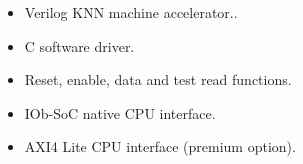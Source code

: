 \begin{itemize}
\item Verilog KNN machine accelerator..
\item C software driver.
\item Reset, enable, data and test read functions.
\item IOb-SoC native CPU interface.
\item AXI4 Lite CPU interface (premium option).
\end{itemize}

